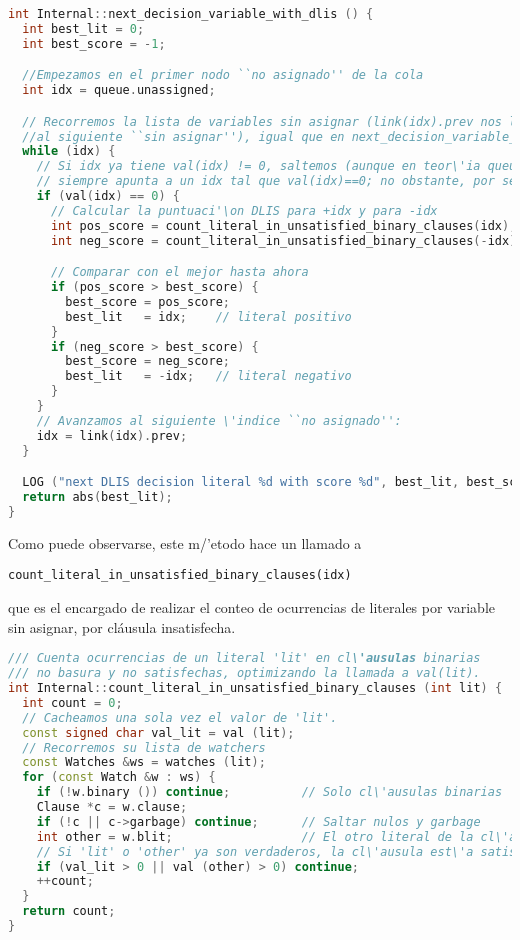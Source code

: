 \begin{lstlisting}[escapechar=!., language=C++]
int Internal::next_decision_variable_with_dlis () {
  int best_lit = 0;
  int best_score = -1;

  //Empezamos en el primer nodo ``no asignado'' de la cola
  int idx = queue.unassigned;

  // Recorremos la lista de variables sin asignar (link(idx).prev nos lleva
  //al siguiente ``sin asignar''), igual que en next_decision_variable_on_queue().
  while (idx) {
    // Si idx ya tiene val(idx) != 0, saltemos (aunque en teor\'ia queue.unassigned
    // siempre apunta a un idx tal que val(idx)==0; no obstante, por seguridad lo comprobamos).
    if (val(idx) == 0) {
      // Calcular la puntuaci'\on DLIS para +idx y para -idx
      int pos_score = count_literal_in_unsatisfied_binary_clauses(idx);
      int neg_score = count_literal_in_unsatisfied_binary_clauses(-idx);

      // Comparar con el mejor hasta ahora
      if (pos_score > best_score) {
        best_score = pos_score;
        best_lit   = idx;    // literal positivo
      }
      if (neg_score > best_score) {
        best_score = neg_score;
        best_lit   = -idx;   // literal negativo
      }
    }
    // Avanzamos al siguiente \'indice ``no asignado'':
    idx = link(idx).prev;
  }

  LOG ("next DLIS decision literal %d with score %d", best_lit, best_score);
  return abs(best_lit);
}
\end{lstlisting}
Como puede observarse, este m/'etodo hace un llamado a \begin{lstlisting}
count_literal_in_unsatisfied_binary_clauses(idx)
\end{lstlisting} 
que es el encargado de realizar el conteo de ocurrencias de literales por variable sin asignar, por cl\'ausula insatisfecha.

\begin{lstlisting}[escapechar=!., language=C++]
/// Cuenta ocurrencias de un literal 'lit' en cl\'ausulas binarias
/// no basura y no satisfechas, optimizando la llamada a val(lit).
int Internal::count_literal_in_unsatisfied_binary_clauses (int lit) {
  int count = 0;
  // Cacheamos una sola vez el valor de 'lit'.
  const signed char val_lit = val (lit);
  // Recorremos su lista de watchers
  const Watches &ws = watches (lit);
  for (const Watch &w : ws) {
    if (!w.binary ()) continue;          // Solo cl\'ausulas binarias
    Clause *c = w.clause;                
    if (!c || c->garbage) continue;      // Saltar nulos y garbage
    int other = w.blit;                  // El otro literal de la cl\'ausula
    // Si 'lit' o 'other' ya son verdaderos, la cl\'ausula est\'a satisfecha
    if (val_lit > 0 || val (other) > 0) continue;
    ++count;
  }
  return count;
}
\end{lstlisting}

